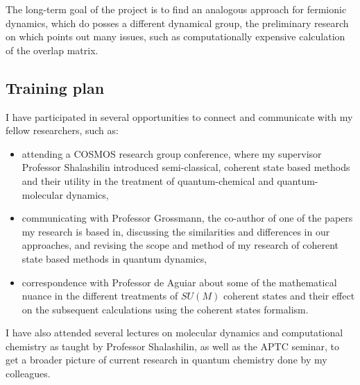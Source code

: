 \documentclass[12pt]{article}
\begin{document}
	The long-term goal of the project is to find an analogous approach for fermionic dynamics, which do posses a different dynamical group, the preliminary research on which points out many issues, such as computationally expensive calculation of the overlap matrix.
	
	\subsection{Training plan}
	
	I have participated in several opportunities to connect and communicate with my fellow researchers, such as:
	\begin{itemize}		
		\item attending a COSMOS research group conference, where my supervisor Professor Shalashilin introduced semi-classical, coherent state based methods and their utility in the treatment of quantum-chemical and quantum-molecular dynamics,
		\item communicating with Professor Grossmann, the co-author of one of the papers my research is based in, discussing the similarities and differences in our approaches, and revising the scope and method of my research of coherent state based methods in quantum dynamics,
		\item correspondence with Professor de Aguiar about some of the mathematical nuance in the different treatments of $SU(M)$ coherent states and their effect on the subsequent calculations using the coherent states formalism.
	\end{itemize}
	
	I have also attended several lectures on molecular dynamics and computational chemistry as taught by Professor Shalashilin, as well as the APTC seminar, to get a broader picture of current research in quantum chemistry done by my colleagues.
	
\end{document}

